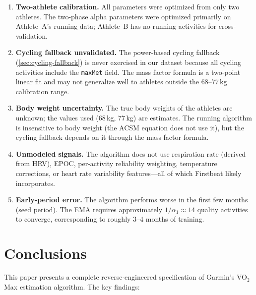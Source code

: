 \documentclass[11pt,a4paper]{article}
\begin{document}
\begin{enumerate}
    \item \textbf{Two-athlete calibration.}
    All parameters were optimized from only two athletes.
    The two-phase alpha parameters were optimized primarily on Athlete~A's running data; Athlete~B has no running activities for cross-validation.

    \item \textbf{Cycling fallback unvalidated.}
    The power-based cycling fallback (\cref{sec:cycling-fallback}) is never exercised in our dataset because all cycling activities include the \texttt{maxMet} field.
    The mass factor formula is a two-point linear fit and may not generalize well to athletes outside the 68--77\,kg calibration range.

    \item \textbf{Body weight uncertainty.}
    The true body weights of the athletes are unknown; the values used (68\,kg, 77\,kg) are estimates.
    The running algorithm is insensitive to body weight (the ACSM equation does not use it), but the cycling fallback depends on it through the mass factor formula.

    \item \textbf{Unmodeled signals.}
    The algorithm does not use respiration rate (derived from HRV), EPOC, per-activity reliability weighting, temperature corrections, or heart rate variability features---all of which Firstbeat likely incorporates.

    \item \textbf{Early-period error.}
    The algorithm performs worse in the first few months (seed period).
    The EMA requires approximately $1/\alpha_1 \approx 14$ quality activities to converge, corresponding to roughly 3--4 months of training.
\end{enumerate}


\section{Conclusions}
\label{sec:conclusions}

This paper presents a complete reverse-engineered specification of Garmin's VO$_2$Max estimation algorithm.
The key findings:
\end{document}
